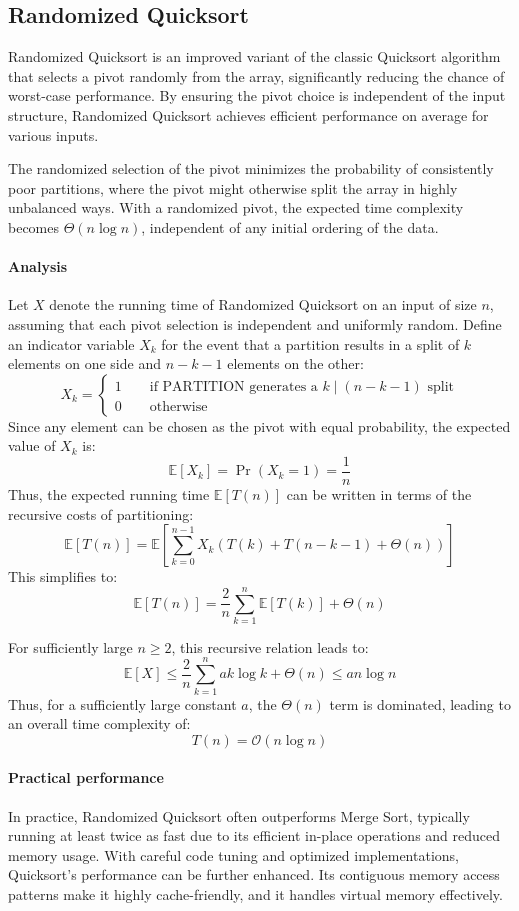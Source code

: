 \subsection{Randomized Quicksort}
Randomized Quicksort is an improved variant of the classic Quicksort algorithm that selects a pivot randomly from the array, significantly reducing the chance of worst-case performance.
By ensuring the pivot choice is independent of the input structure, Randomized Quicksort achieves efficient performance on average for various inputs.

The randomized selection of the pivot minimizes the probability of consistently poor partitions, where the pivot might otherwise split the array in highly unbalanced ways. 
With a randomized pivot, the expected time complexity becomes $\Theta(n \log n)$, independent of any initial ordering of the data.

\paragraph*{Analysis}
Let $X$ denote the running time of Randomized Quicksort on an input of size $n$, assuming that each pivot selection is independent and uniformly random. 
Define an indicator variable $X_k$ for the event that a partition results in a split of $k$ elements on one side and $n-k-1$ elements on the other:
\[X_k=\begin{cases}
    1 \qquad \text{if PARTITION generates a } k \mid (n-k-1) \text{ split} \\
    0 \qquad \text{otherwise}
\end{cases}\]
Since any element can be chosen as the pivot with equal probability, the expected value of $X_k$ is: 
\[\mathbb{E}[X_k] = \Pr(X_k = 1) = \dfrac{1}{n}\]
Thus, the expected running time $\mathbb{E}[T(n)]$ can be written in terms of the recursive costs of partitioning:
\[\mathbb{E}[T(n)] = \mathbb{E} \left[ \sum_{k=0}^{n-1} X_k \left( T(k) + T(n - k - 1) + \Theta(n) \right) \right]\]
This simplifies to:
\[\mathbb{E}[T(n)] =\frac{2}{n} \sum_{k=1}^{n} \mathbb{E}[T(k)] + \Theta(n)\]

For sufficiently large $n \geq 2$, this recursive relation leads to:
\[\mathbb{E}[X]\leq \frac{2}{n} \sum_{k=1}^{n} ak\log k + \Theta(n)\leq an\log n\]
Thus, for a sufficiently large constant $a$, the $\Theta(n)$ term is dominated, leading to an overall time complexity of:
\[T(n)=\mathcal{O}(n\log n)\]

\paragraph*{Practical performance}
In practice, Randomized Quicksort often outperforms Merge Sort, typically running at least twice as fast due to its efficient in-place operations and reduced memory usage. 
With careful code tuning and optimized implementations, Quicksort's performance can be further enhanced. 
Its contiguous memory access patterns make it highly cache-friendly, and it handles virtual memory effectively.

